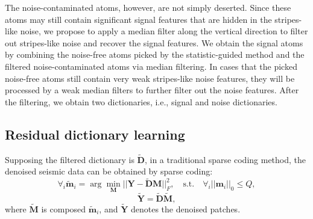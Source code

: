 The noise-contaminated atoms, however, are not simply deserted. Since these atoms may still contain significant signal features that are hidden in the stripes-like noise, we propose to apply a median filter along the vertical direction to filter out stripes-like noise and recover the signal features. We obtain the signal atoms by combining the noise-free atoms picked by the statistic-guided method and the filtered noise-contaminated atoms via median filtering. In cases that the picked noise-free atoms still contain very weak stripes-like noise features, they will be processed by a weak median filters to further filter out the noise features. 
After the filtering, we obtain two dictionaries, i.e., signal and noise dictionaries. 

\subsection{Residual dictionary learning}
Supposing the filtered dictionary is $\tilde{\mathbf{D}}$,  in a traditional sparse coding method, the denoised seismic data can be obtained by sparse coding:
\begin{equation}
\label{eq:sc0}
\forall_i \tilde{\mathbf{m}}_{i}=\arg\min_{\mathbf{M}}||\mathbf{Y}-\tilde{\mathbf{D}}\mathbf{M}||^{2}_{F}, \quad\text{s.t.}  \quad \forall_i ||\mathbf{m}_{i}||_{0}\le Q,
\end{equation}
\begin{equation}
\label{eq:sc1}
\tilde{\mathbf{Y}} = \tilde{\mathbf{D}} \tilde{\mathbf{M}},
\end{equation}
where $\tilde{\mathbf{M}}$ is composed  $\tilde{\mathbf{m}}_{i}$, and $\tilde{\mathbf{Y}}$ denotes the denoised patches.


